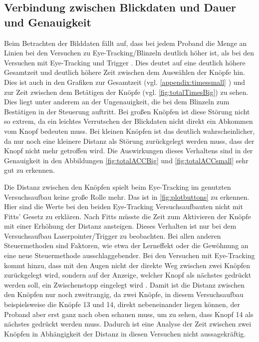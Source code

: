 \subsection{Verbindung zwischen Blickdaten und Dauer und Genauigkeit}
\label{section:heatmapsAnalysis}
Beim Betrachten der Bilddaten fällt auf, dass bei jedem Proband die Menge an Linien bei den Versuchen zu Eye-Tracking/Blinzeln deutlich höher ist, als bei den Versuchen mit Eye-Tracking und Trigger . Dies deutet auf eine deutlich höhere Gesamtzeit und deutlich höhere Zeit zwischen dem Auswählen der Knöpfe hin. Dies ist auch in den Grafiken zur Gesamtzeit (vgl. \autoref{appendix:timessmall} ) und zur Zeit zwischen dem Betätigen der Knöpfe (vgl. \autoref{fig:totalTimesBig}) zu sehen. Dies liegt unter anderem an der Ungenauigkeit, die bei dem Blinzeln zum Bestätigen in der Steuerung auftritt. Bei großen Knöpfen ist diese Störung nicht so extrem, da ein leichtes Verrutschen der Blickdaten nicht direkt ein Abkommen vom Knopf bedeuten muss. Bei kleinen Knöpfen ist das deutlich wahrscheinlicher, da nur noch eine kleinere Distanz als Störung zurückgelegt werden muss, dass der Knopf nicht mehr getroffen wird. Die Auswirkungen dieses Verhaltens sind in der Genauigkeit in den Abbildungen \ref{fig:totalACCBig} und \ref{fig:totalACCsmall} sehr gut zu erkennen. 

Die Distanz zwischen den Knöpfen spielt beim Eye-Tracking im genutzten Versuchsaufbau keine große Rolle mehr. Das ist in \autoref{fig:plotbuttons} zu erkennen. Hier sind die Werte bei den beiden Eye-Tracking Versuchsaufbauten nicht mit Fitts' Gesetz zu erklären. Nach Fitts müsste die Zeit zum Aktivieren der Knöpfe mit einer Erhöhung der Distanz ansteigen. Dieses Verhalten ist nur bei dem Versuchsaufbau Laserpointer/Trigger zu beobachten. Bei allen anderen Steuermethoden sind Faktoren, wie etwa der Lerneffekt oder die Gewöhnung an eine neue Steuermethode ausschlaggebender. Bei den Versuchen mit Eye-Tracking kommt hinzu, dass mit den Augen nicht der direkte Weg zwischen zwei Knöpfen zurückgelegt wird, sondern auf der Anzeige, welcher Knopf als nächstes gedrückt werden soll, ein Zwischenstopp eingelegt wird . Damit ist die Distanz zwischen den Knöpfen nur noch zweitrangig, da zwei Knöpfe, in diesem Versuchsaufbau beispielsweise die Knöpfe 13 und 14, direkt nebeneinander liegen können, der Proband aber erst ganz nach oben schauen muss, um zu sehen, dass Knopf 14 als nächstes gedrückt werden muss. Dadurch ist eine Analyse der Zeit zwischen zwei Knöpfen in Abhängigkeit der Distanz in diesen Versuchen nicht aussagekräftig.

